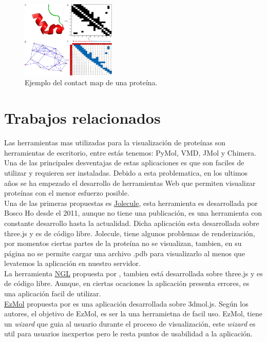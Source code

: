 \documentclass{article}
\begin{document}
	\begin{figure}
		\centering
		\includegraphics[width=0.4\textwidth]{img/papers/contact_map}
		\caption{Ejemplo del contact map de una proteína.}
		\label{fig:contact_map}
	\end{figure}
	
\section{Trabajos relacionados}

Las herramientas mas utilizadas para la visualización de proteínas son herramientas de escritorio, entre estás tenemos: PyMol, VMD, JMol y Chimera. Una de las principales desventajas de estas aplicaciones es que son faciles de utilizar y requieren ser instaladas. Debido a esta problematica, en los ultimos años se ha empezado el desarrollo de herramientas Web que permiten visualizar proteínas con el menor esfuerzo posible. \\

Una de las primeras propuestas es \href{http://jolecule.com/}{Jolecule}, esta herramienta es desarrollada por Bosco Ho desde el 2011, aunque no tiene una publicación, es una herramienta con constante desarrollo hasta la actualidad. Dicha aplicación esta desarrollada sobre three.js y es de código libre. Jolecule, tiene algunos problemas de renderización, por momentos ciertas partes de la proteína no se visualizan, tambien, en su página no se permite cargar una archivo .pdb para visualizarlo al menos que levatemos la aplicación en nuestro servidor. \\

La herramienta \href{https://nglviewer.org/}{NGL}  propuesta por \cite{rose2015ngl}, tambien está desarrollada sobre three.js y es de código libre. Aunque, en ciertas ocaciones la aplicación presenta errores, es una aplicación facil de utilizar.\\


\href{http://www.sbg.bio.ic.ac.uk/ezmol/}{EzMol} propuesta por \cite{reynolds2018ezmol} es una aplicación  desarrollada sobre 3dmol.js. Según los autores, el objetivo de EzMol, es ser la una herramietna de facil uso. EzMol, tiene un \textit{wizard} que guia al usuario durante el proceso de visualización, este \textit{wizard} es util para usuarios inexpertos pero le resta puntos de usabilidad a la aplicación.  \\
\end{document}
